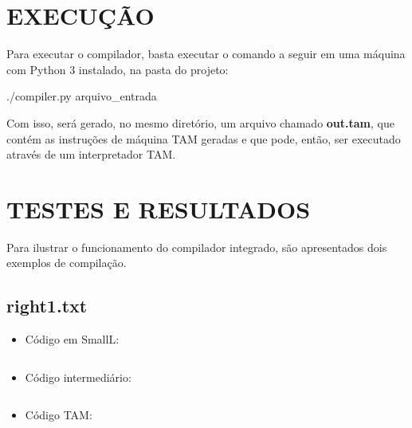 \documentclass[12pt]{article}
\begin{document}
\section{EXECUÇÃO}

Para executar o compilador, basta executar o comando a seguir em uma máquina com Python 3 instalado, na pasta do
projeto:

\begin{center}
  ./compiler.py arquivo\_entrada
\end{center}

Com isso, será gerado, no mesmo diretório, um arquivo chamado \textbf{out.tam}, que contém as instruções de máquina TAM geradas
e que pode, então, ser executado através de um interpretador TAM.

\section{TESTES E RESULTADOS}

Para ilustrar o funcionamento do compilador integrado, são apresentados dois exemplos de compilação.

\subsection{right1.txt}

\begin{itemize}
 \item Código em SmallL:\\
 
  \begin{mdframed}[linecolor=black, leftline=false, rightline=false]
    \inputminted[linenos, fontsize=\footnotesize]{text}{../input/right1.txt}
  \end{mdframed}
  
  \mbox{}
 
 \item Código intermediário: \\
 
 \begin{mdframed}[linecolor=black, leftline=false, rightline=false]
    \inputminted[linenos, fontsize=\footnotesize]{text}{right1.out}
  \end{mdframed}

  \mbox{}
  
  \item Código TAM: \\
 
 \begin{mdframed}[linecolor=black, leftline=false, rightline=false]
    \inputminted[linenos, fontsize=\footnotesize]{text}{right1.tam}
  \end{mdframed}
\end{itemize}
\end{document}

